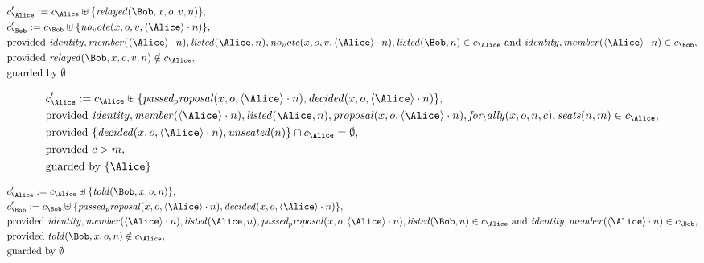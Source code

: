 \begin{align*}
&
c'_
{
\Alice
}
 := 
c_
{
\Alice
}
 \uplus 
\{
\mathit{
relayed
}
(
\Bob
,
x
,
o
,
v
,
n
)
\}
,\\
&
c'_
{
\Bob
}
 := 
c_
{
\Bob
}
 \uplus 
\{
\mathit{
no_vote
}
(
x
,
o
,
v
,
\langle
\Alice
\rangle
\cdot
n
)
\}
,\\
&
\text{provided } 
\mathit{
identity
}
,
\mathit{
member
}
(
\langle
\Alice
\rangle
\cdot
n
)
,
\mathit{
listed
}
(
\Alice
,
n
)
,
\mathit{
no_vote
}
(
x
,
o
,
v
,
\langle
\Alice
\rangle
\cdot
n
)
,
\mathit{
listed
}
(
\Bob
,
n
)
 \in c_
{
\Alice
}
 \text{ and } 
\mathit{
identity
}
,
\mathit{
member
}
(
\langle
\Alice
\rangle
\cdot
n
)
 \in c_
{
\Bob
}
,\\
&
\text{provided } 
\mathit{
relayed
}
(
\Bob
,
x
,
o
,
v
,
n
)
 \notin c_
{
\Alice
}
,\\
&
\text{guarded by } \emptyset
\end{align*}

\begin{align*}
&
c'_
{
\Alice
}
 := 
c_
{
\Alice
}
 \uplus 
\{
\mathit{
passed_proposal
}
(
x
,
o
,
\langle
\Alice
\rangle
\cdot
n
)
,
\mathit{
decided
}
(
x
,
o
,
\langle
\Alice
\rangle
\cdot
n
)
\}
,\\
&
\text{provided } 
\mathit{
identity
}
,
\mathit{
member
}
(
\langle
\Alice
\rangle
\cdot
n
)
,
\mathit{
listed
}
(
\Alice
,
n
)
,
\mathit{
proposal
}
(
x
,
o
,
\langle
\Alice
\rangle
\cdot
n
)
,
\mathit{
for_tally
}
(
x
,
o
,
n
,
c
)
,
\mathit{
seats
}
(
n
,
m
)
 \in c_
{
\Alice
}
,\\
&
\text{provided } 
\{
\mathit{
decided
}
(
x
,
o
,
\langle
\Alice
\rangle
\cdot
n
)
,
\mathit{
unseated
}
(
n
)
\}
 \cap c_
{
\Alice
}
 = \emptyset
,\\
&
\text{provided } 
c
>
m
,\\
&
\text{guarded by } \{
\Alice
\}
\end{align*}

\begin{align*}
&
c'_
{
\Alice
}
 := 
c_
{
\Alice
}
 \uplus 
\{
\mathit{
told
}
(
\Bob
,
x
,
o
,
n
)
\}
,\\
&
c'_
{
\Bob
}
 := 
c_
{
\Bob
}
 \uplus 
\{
\mathit{
passed_proposal
}
(
x
,
o
,
\langle
\Alice
\rangle
\cdot
n
)
,
\mathit{
decided
}
(
x
,
o
,
\langle
\Alice
\rangle
\cdot
n
)
\}
,\\
&
\text{provided } 
\mathit{
identity
}
,
\mathit{
member
}
(
\langle
\Alice
\rangle
\cdot
n
)
,
\mathit{
listed
}
(
\Alice
,
n
)
,
\mathit{
passed_proposal
}
(
x
,
o
,
\langle
\Alice
\rangle
\cdot
n
)
,
\mathit{
listed
}
(
\Bob
,
n
)
 \in c_
{
\Alice
}
 \text{ and } 
\mathit{
identity
}
,
\mathit{
member
}
(
\langle
\Alice
\rangle
\cdot
n
)
 \in c_
{
\Bob
}
,\\
&
\text{provided } 
\mathit{
told
}
(
\Bob
,
x
,
o
,
n
)
 \notin c_
{
\Alice
}
,\\
&
\text{guarded by } \emptyset
\end{align*}
